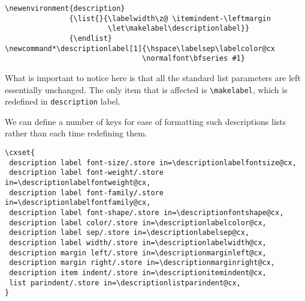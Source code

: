 \begin{tcolorbox}
\begin{lstlisting}
\newenvironment{description}
               {\list{}{\labelwidth\z@ \itemindent-\leftmargin
                        \let\makelabel\descriptionlabel}}
               {\endlist}
\newcommand*\descriptionlabel[1]{\hspace\labelsep\labelcolor@cx
                                \normalfont\bfseries #1}
\end{lstlisting}
\end{tcolorbox}

What is important to notice here is that all the standard list parameters are left essentially unchanged. The only item that is affected is \lstinline{\makelabel}, which is redefined in \lstinline{description} label.


We can define a number of keys for ease of formatting such descriptions lists rather than each time redefining them.


\begin{tcolorbox}[title=Basic description list keys]
\begin{lstlisting}
\cxset{
 description label font-size/.store in=\descriptionlabelfontsize@cx,
 description label font-weight/.store in=\descriptionlabelfontweight@cx,
 description label font-family/.store in=\descriptionlabelfontfamily@cx,
 description label font-shape/.store in=\descriptionfontshape@cx,
 description label color/.store in=\descriptionlabelcolor@cx,
 description label sep/.store in=\descriptionlabelsep@cx,
 description label width/.store in=\descriptionlabelwidth@cx,
 description margin left/.store in=\descriptionmarginleft@cx,
 description margin right/.store in=\descriptionmarginright@cx,
 description item indent/.store in=\descriptionitemindent@cx,
 list parindent/.store in=\descriptionlistparindent@cx,
}
\end{lstlisting}
\end{tcolorbox}


